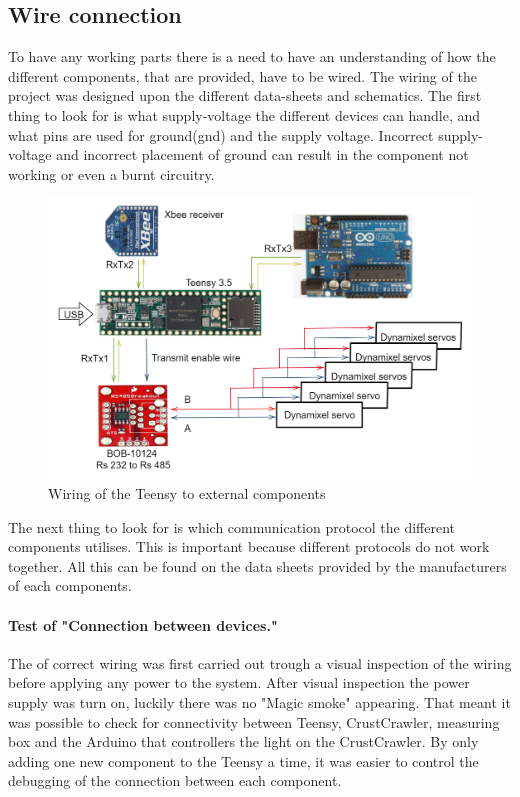 \subsection*{Wire connection}
To have any working parts there is a need to have an understanding of how the different components, that are provided, have to be wired. The wiring of the project was designed upon the different data-sheets and schematics. The first thing to look for is what supply-voltage the different devices can handle, and what pins are used for ground(gnd) and the supply voltage. 
Incorrect supply-voltage and incorrect placement of ground can result in the component not working or even a burnt circuitry.\\
\begin{figure}[H]
    \centering
%
    \includegraphics[scale=0.30]{Figures/Technical_figures/HWlayout.png}
    \caption{Wiring of the Teensy to external components}
    \label{fig:motorSel}
\end{figure}
The next thing to look for is which communication protocol the different components utilises. This is important because different protocols do not work together. All this can be found on the data sheets provided by the manufacturers of each components.
\paragraph{Test of "Connection between devices."}
The of correct wiring was first carried out trough a visual inspection of the wiring before applying any power to the system. After visual inspection the power supply was turn on, luckily there was no "Magic smoke" appearing. That meant it was possible to check for connectivity between Teensy, CrustCrawler, measuring box and the Arduino that controllers the light on the CrustCrawler.
By only adding one new component to the Teensy a time, it was easier to control the debugging of the connection between each component.

